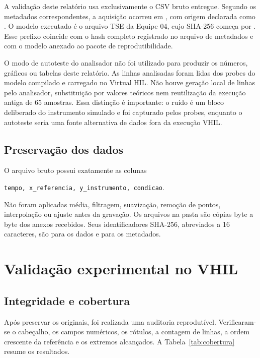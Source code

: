 \documentclass[12pt,a4paper]{article}
\newcommand{\arquivo}[1]{\texttt{\detokenize{#1}}}
\begin{document}
A validação deste relatório usa exclusivamente o CSV bruto entregue. Segundo os metadados correspondentes, a aquisição ocorreu em \DataAquisicao, com origem declarada como \OrigemAquisicao. O modelo executado é o arquivo TSE da Equipe 04, cujo SHA-256 começa por \HashModeloCurto. Esse prefixo coincide com o hash completo registrado no arquivo de metadados e com o modelo anexado ao pacote de reprodutibilidade.

O modo de autoteste do analisador não foi utilizado para produzir os números, gráficos ou tabelas deste relatório. As \TotalAmostras{} linhas analisadas foram lidas dos probes do modelo compilado e carregado no Virtual HIL. Não houve geração local de linhas pelo analisador, substituição por valores teóricos nem reutilização da execução antiga de 65 amostras. Essa distinção é importante: o ruído é um bloco deliberado do instrumento simulado e foi capturado pelos probes, enquanto o autoteste seria uma fonte alternativa de dados fora da execução VHIL.

\subsection{Preservação dos dados}

O arquivo bruto possui exatamente as colunas

\begin{center}
  \texttt{tempo, x\_referencia, y\_instrumento, condicao}.
\end{center}

Não foram aplicadas média, filtragem, suavização, remoção de pontos, interpolação ou ajuste antes da gravação. Os arquivos na pasta \arquivo{dados/} são cópias byte a byte dos anexos recebidos. Seus identificadores SHA-256, abreviados a 16 caracteres, são \HashDados{} para os dados e \HashMetadados{} para os metadados.

\section{Validação experimental no VHIL}

\subsection{Integridade e cobertura}

Após preservar os originais, foi realizada uma auditoria reprodutível. Verificaram-se o cabeçalho, os campos numéricos, os rótulos, a contagem de linhas, a ordem crescente da referência e os extremos alcançados. A Tabela~\ref{tab:cobertura} resume os resultados.
\end{document}
